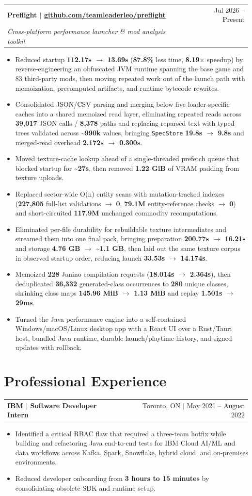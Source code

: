 \documentclass[letterpaper,11pt]{article}
\makeatletter
\newcommand{\resumeHeading}[4]{%
  \begin{tabularx}{\textwidth}{@{}Xr@{}}
    \textbf{#1} & #2 \\
    \textit{\small #3} & \textit{\small #4}
  \end{tabularx}\vspace{-2pt}
}
\newcommand{\resumeHeadingSimple}[2]{%
  \begin{tabularx}{\textwidth}{@{}Xr@{}}
    \textbf{#1} & #2
  \end{tabularx}\vspace{-0.25pt}
}
\newcommand{\resumeItemListStart}{\begin{itemize}[leftmargin=0.23in,itemsep=0.8pt,parsep=0pt,topsep=0.6pt]}
\newcommand{\resumeItem}[1]{\item\fontsize{10.2pt}{11.7pt}\selectfont #1}
\newcommand{\resumeItemListEnd}{\end{itemize}\vspace{-0.25pt}}
\makeatother
\begin{document}
\resumeHeading
  {Preflight $|$ \href{https://github.com/teamleaderleo/preflight}{github.com/teamleaderleo/preflight}}
  {Jul 2026 -- Present}
  {\normalfont Cross-platform performance launcher \& mod analysis toolkit}
  {}
\resumeItemListStart
  \resumeItem{Reduced startup \textbf{112.17s $\rightarrow$ 13.69s} (\textbf{87.8\%} less time, \textbf{8.19$\times$} speedup) by reverse-engineering an obfuscated JVM runtime spanning the base game and 83 third-party mods, then moving repeated work out of the launch path with memoization, precomputed artifacts, and runtime bytecode rewrites.}
  \resumeItem{Consolidated JSON/CSV parsing and merging below five loader-specific caches into a shared memoized read layer, eliminating repeated reads across \textbf{39,017} JSON calls / \textbf{8,378} paths and replacing reparsed text with typed trees validated across \textbf{\textasciitilde990k} values, bringing \texttt{SpecStore} \textbf{19.8s $\rightarrow$ 9.8s} and merged-read overhead \textbf{2.172s $\rightarrow$ 0.300s}.}
  \resumeItem{Moved texture-cache lookup ahead of a single-threaded prefetch queue that blocked startup for \textbf{\textasciitilde27s}, then removed \textbf{1.22 GiB} of VRAM padding from texture uploads.}
  \resumeItem{Replaced sector-wide O(n) entity scans with mutation-tracked indexes (\textbf{227,805} full-list validations $\rightarrow$ \textbf{0}, \textbf{79.1M} entity-reference checks $\rightarrow$ \textbf{0}) and short-circuited \textbf{117.9M} unchanged commodity recomputations.}
  \resumeItem{Eliminated per-file durability for rebuildable texture intermediates and streamed them into one final pack, bringing preparation \textbf{200.77s $\rightarrow$ 16.21s} and storage \textbf{4.76 GB $\rightarrow$ \textasciitilde1.1 GB}, then laid out the same texture corpus in observed startup order, reducing launch \textbf{33.53s $\rightarrow$ 14.174s}.}
  \resumeItem{Memoized \textbf{228} Janino compilation requests (\textbf{18.014s $\rightarrow$ 2.364s}), then deduplicated \textbf{36,332} generated-class occurrences to \textbf{280} unique classes, shrinking class maps \textbf{145.96 MiB $\rightarrow$ 1.13 MiB} and replay \textbf{1.501s $\rightarrow$ 29ms}.}
  \resumeItem{Turned the Java performance engine into a self-contained Windows/macOS/Linux desktop app with a React UI over a Rust/Tauri host, bundled Java runtime, durable launch/playtime history, and signed updates with rollback.}
\resumeItemListEnd

\section{Professional Experience}
\resumeHeadingSimple
  {IBM $|$ Software Developer Intern}
  {Toronto, ON $|$ May 2021 -- August 2022}
\resumeItemListStart
  \resumeItem{Identified a critical RBAC flaw that required a three-team hotfix while building and refactoring Java end-to-end tests for IBM Cloud AI/ML and data workflows across Kafka, Spark, Snowflake, hybrid cloud, and on-premises environments.}
  \resumeItem{Reduced developer onboarding from \textbf{3 hours to 15 minutes} by consolidating obsolete SDK and runtime setup.}
\resumeItemListEnd
\end{document}
